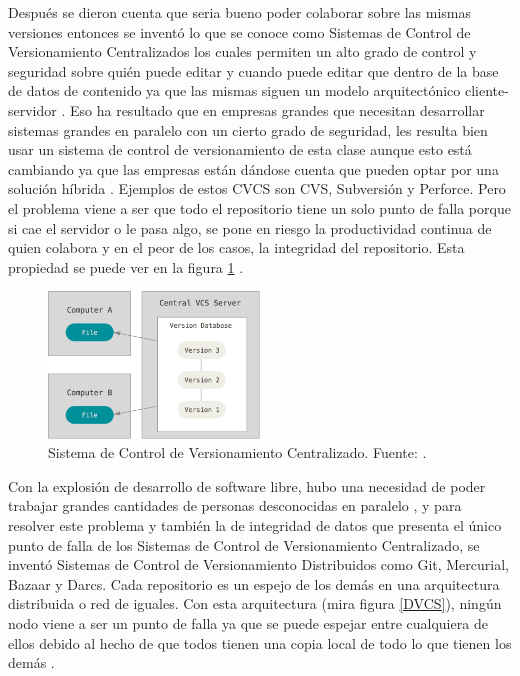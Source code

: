 Después se dieron cuenta que seria bueno poder colaborar sobre las mismas versiones entonces se inventó lo que se conoce como Sistemas de Control de Versionamiento Centralizados los cuales permiten un alto grado de control y seguridad sobre quién puede editar y cuando puede editar que dentro de la base de datos de contenido ya que las mismas siguen un modelo arquitectónico cliente-servidor \citep{PROGIT-Git-VCS}. Eso ha resultado que en empresas grandes que necesitan desarrollar sistemas grandes en paralelo con un cierto grado de seguridad, les resulta bien usar un sistema de control de versionamiento de esta clase aunque esto está cambiando ya que las empresas están dándose cuenta que pueden optar por una solución híbrida \citep{CollabNet-Dist-or-Cent}. Ejemplos de estos CVCS son CVS, Subversión y Perforce. Pero el problema viene a ser que todo el repositorio tiene un solo punto de falla porque si cae el servidor o le pasa algo, se pone en riesgo la productividad continua de quien colabora y en el peor de los casos, la integridad del repositorio. Esta propiedad se puede ver en la figura \ref{CVCS} \citep{PROGIT-Git-VCS}.

\begin{figure}
  \begin{center}
  	\includegraphics[width=0.5\textwidth]{Figures/cvcs.png}
  \end{center}
  \caption{Sistema de Control de Versionamiento Centralizado. Fuente:  \citep{PROGIT-Git-VCS}.}
  \label{CVCS}
\end{figure}

Con la explosión de desarrollo de software libre, hubo una necesidad de poder trabajar grandes cantidades de personas desconocidas en paralelo \citep{raymond1999cathedral}, y para resolver este problema y también la de integridad de datos que presenta el único punto de falla de los Sistemas de Control de Versionamiento Centralizado, se inventó Sistemas de Control de Versionamiento Distribuidos como Git, Mercurial, Bazaar y Darcs. Cada repositorio es un espejo de los demás en una arquitectura distribuida o red de iguales. Con esta arquitectura (mira figura \ref{DVCS}), ningún nodo viene a ser un punto de falla ya que se puede espejar entre cualquiera de ellos debido al hecho de que todos tienen una copia local de todo lo que tienen los demás \citep{PROGIT-Git-VCS}. 

